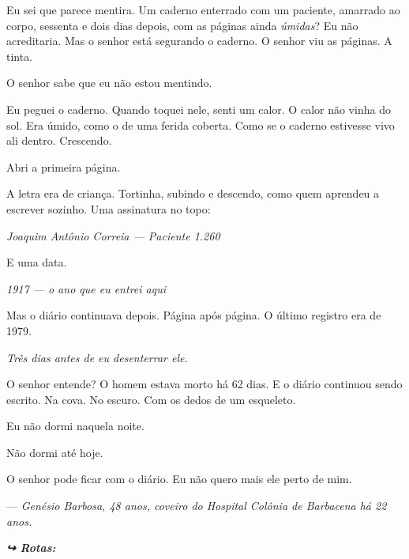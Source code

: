 \noindent Eu sei que parece mentira. Um caderno enterrado com um paciente, amarrado ao corpo, sessenta e dois dias depois, com as páginas ainda \textit{úmidas}? Eu não acreditaria. Mas o senhor está segurando o caderno. O senhor viu as páginas. A tinta.

\noindent O senhor sabe que eu não estou mentindo.

\noindent Eu peguei o caderno. Quando toquei nele, senti um calor. O calor não vinha do sol. Era úmido, como o de uma ferida coberta. Como se o caderno estivesse vivo ali dentro. Crescendo.

\noindent Abri a primeira página.

\noindent A letra era de criança. Tortinha, subindo e descendo, como quem aprendeu a escrever sozinho. Uma assinatura no topo:

\noindent \textit{Joaquim Antônio Correia --- Paciente 1.260}

\noindent E uma data.

\noindent \textit{1917 --- o ano que eu entrei aqui}

\noindent Mas o diário continuava depois. Página após página. O último registro era de 1979.

\noindent \textit{Três dias antes de eu desenterrar ele.}

\noindent O senhor entende? O homem estava morto há 62 dias. E o diário continuou sendo escrito. Na cova. No escuro. Com os dedos de um esqueleto.

\noindent Eu não dormi naquela noite.

\noindent Não dormi até hoje.

\noindent O senhor pode ficar com o diário. Eu não quero mais ele perto de mim.

\noindent --- \textit{Genésio Barbosa, 48 anos, coveiro do Hospital Colônia de Barbacena há 22 anos.}

\vspace{0.5em}
\noindent\textit{\textbf{↪ Rotas:}  \rotasep {}}